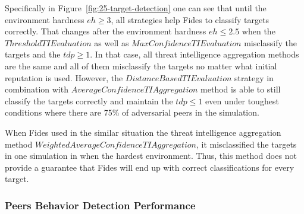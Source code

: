 Specifically in Figure~\ref{fig:25-target-detection} one can see that until the environment hardness $eh \geq 3$, all strategies help Fides to classify targets correctly.
That changes after the environment hardness $eh \leq 2.5$ when the $ThresholdTIEvaluation$ as well as $MaxConfidenceTIEvaluation$ misclassify the targets and the $tdp \geq 1$. In that case, all threat intelligence aggregation methods are the same and all of them misclassify the targets no matter what initial reputation is used.
However, the $DistanceBasedTIEvaluation$ strategy in combination with $AverageConfidenceTIAggregation$ method is able to still classify the targets correctly and maintain the $tdp \leq 1$ even under toughest conditions where there are 75\% of adversarial peers in the simulation.

When Fides used in the similar situation the threat intelligence aggregation method $WeightedAverageConfidenceTIAggregation$, it misclassified the targets in one simulation in when the hardest environment.
Thus, this method does not provide a guarantee that Fides will end up with correct classifications for every target.

\cleartoleftpage
\subsubsection{Peers Behavior Detection Performance}

